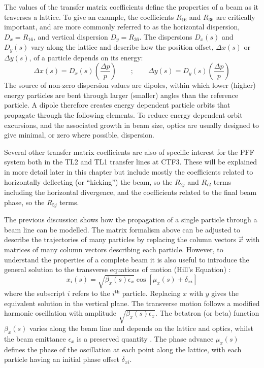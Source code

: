 The values of the transfer matrix coefficients define the properties of a beam as it traverses a lattice. To give an example, the coefficients \(R_{16}\) and \(R_{36}\) are critically important, and are more commonly referred to as the horizontal dispersion, \(D_x = R_{16}\), and vertical dispersion \(D_y = R_{36}\). The dispersions \(D_x(s)\) and \(D_y(s)\) vary along the lattice and describe how the position offset, \(\Delta x(s)\) or \(\Delta y(s)\), of a particle depends on its energy:
\begin{equation}
\Delta x(s) = D_x(s)\left(\frac{\Delta p}{p}\right) 
\qquad\mathrm{;}\qquad
\Delta y(s) = D_y(s)\left(\frac{\Delta p}{p}\right)
\end{equation}
The source of non-zero dispersion values are dipoles, within which lower (higher) energy particles are bent through larger (smaller) angles than the reference particle. A dipole therefore creates energy dependent particle orbits that propagate through the following elements. To reduce energy dependent orbit excursions, and the associated growth in beam size, optics are usually designed to give minimal, or zero where possible, dispersion. 

Several other transfer matrix coefficients are also of specific interest for the PFF system both in the TL2 and TL1 transfer lines at CTF3. These will be explained in more detail later in this chapter but include mostly the coefficients related to horizontally deflecting (or ``kicking'') the beam, so the \(R_{2j}\) and \(R_{i2}\) terms including the horizontal divergence, and the coefficients related to the final beam phase, so the \(R_{5j}\) terms.  

The previous discussion shows how the propagation of a single particle through a beam line can be modelled. The matrix formalism above can be adjusted to describe the trajectories of many particles by replacing the column vectors \(\vec{x}\) with matrices of many column vectors describing each particle. However, to understand the properties of a complete beam it is also useful to introduce the general solution to the transverse equations of motion (Hill's Equation) \cite{lee}:
\begin{equation}
x_i(s) = \sqrt{\beta_x(s)\epsilon_x}\cos[\mu_x(s) + \delta_{xi}]
\label{e:twissEqBeta}
\end{equation}
where the subscript \(i\) refers to the \(i^\mathrm{th}\) particle. Replacing \(x\) with \(y\) gives the equivalent solution in the vertical plane. The transverse motion follows a modified harmonic oscillation with amplitude \(\sqrt{\beta_x(s)\epsilon_x}\). The betatron (or beta) function \(\beta_x(s)\) varies along the beam line and depends on the lattice and optics, whilst the beam emittance \(\epsilon_x\) is a preserved quantity \cite{wolski}. The phase advance \(\mu_x(s)\) defines the phase of the oscillation at each point along the lattice, with each particle having an initial phase offset \(\delta_{xi}\). 

